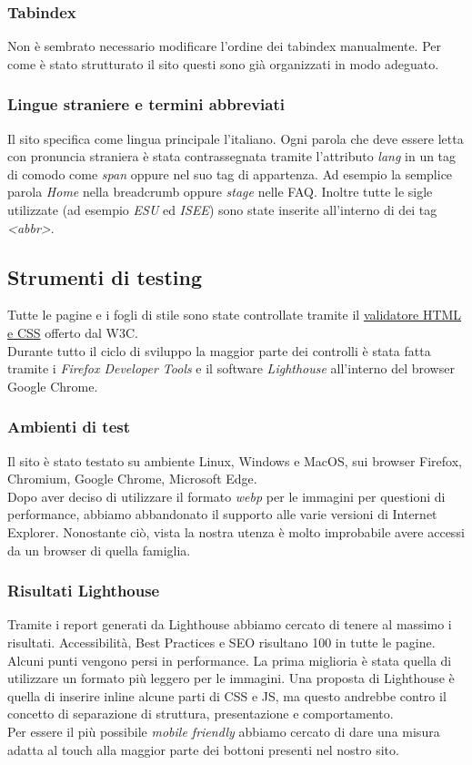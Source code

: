 \subsubsection{Tabindex}
Non è sembrato necessario modificare l'ordine dei tabindex manualmente. Per come è stato strutturato il sito questi sono già organizzati in modo adeguato.

\subsubsection{Lingue straniere e termini abbreviati}
Il sito specifica come lingua principale l'italiano. Ogni parola che deve essere letta con pronuncia straniera è stata contrassegnata tramite l'attributo \textit{lang} in un tag di comodo come \textit{span} oppure nel suo tag di appartenza. Ad esempio la semplice parola \textit{Home} nella breadcrumb oppure \textit{stage} nelle FAQ. Inoltre tutte le sigle utilizzate (ad esempio \textit{ESU} ed \textit{ISEE}) sono state inserite all'interno di dei tag \textit{<abbr>}.

\subsection{Strumenti di testing}

Tutte le pagine e i fogli di stile sono state controllate tramite il \href{https://validator.w3.org/}{validatore HTML e CSS} offerto dal W3C.\\
Durante tutto il ciclo di sviluppo la maggior parte dei controlli è stata fatta tramite i \textit{Firefox Developer Tools} e il software \textit{Lighthouse} all'interno del browser Google Chrome.

\subsubsection{Ambienti di test}
Il sito è stato testato su ambiente Linux, Windows e MacOS, sui browser Firefox, Chromium, Google Chrome, Microsoft Edge.\\
Dopo aver deciso di utilizzare il formato \textit{webp} per le immagini per questioni di performance, abbiamo abbandonato il supporto alle varie versioni di Internet Explorer. Nonostante ciò, vista la nostra utenza è molto improbabile avere accessi da un browser di quella famiglia.\\

\subsubsection{Risultati Lighthouse}
Tramite i report generati da Lighthouse abbiamo cercato di tenere al massimo i risultati. Accessibilità, Best Practices e SEO risultano 100 in tutte le pagine.\\
Alcuni punti vengono persi in performance. La prima miglioria è stata quella di utilizzare un formato più leggero per le immagini. Una proposta di Lighthouse è quella di inserire inline alcune parti di CSS e JS, ma questo andrebbe contro il concetto di separazione di struttura, presentazione e comportamento.\\
Per essere il più possibile \textit{mobile friendly} abbiamo cercato di dare una misura adatta al touch alla maggior parte dei bottoni presenti nel nostro sito.
